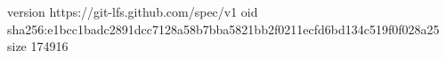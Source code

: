 version https://git-lfs.github.com/spec/v1
oid sha256:e1bcc1badc2891dcc7128a58b7bba5821bb2f0211ecfd6bd134c519f0f028a25
size 174916
